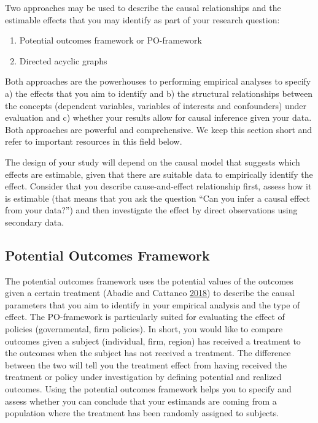 \documentclass[
]{book}
\providecommand{\tightlist}{%
  \setlength{\itemsep}{0pt}\setlength{\parskip}{0pt}}
\begin{document}
Two approaches may be used to describe the causal relationships and the
estimable effects that you may identify as part of your research
question:

\begin{enumerate}
\def\labelenumi{\arabic{enumi}.}
\tightlist
\item
  Potential outcomes framework or PO-framework
\item
  Directed acyclic graphs
\end{enumerate}

Both approaches are the powerhouses to performing empirical analyses to
specify a) the effects that you aim to identify and b) the structural
relationships between the concepts (dependent variables, variables of
interests and confounders) under evaluation and c) whether your results
allow for causal inference given your data. Both approaches are powerful
and comprehensive. We keep this section short and refer to important
resources in this field below.

The design of your study will depend on the causal model that suggests
which effects are estimable, given that there are suitable data to
empirically identify the effect. Consider that you describe
cause-and-effect relationship first, assess how it is estimable (that
means that you ask the question ``Can you infer a causal effect from
your data?'') and then investigate the effect by direct observations
using secondary data.

\hypertarget{potential-outcomes-framework}{%
\subsection{Potential Outcomes
Framework}\label{potential-outcomes-framework}}

The potential outcomes framework uses the potential values of the
outcomes given a certain treatment (Abadie and Cattaneo
\protect\hyperlink{ref-abadie_econometric_2018}{2018}) to describe the
causal parameters that you aim to identify in your empirical analysis
and the type of effect. The PO-framework is particularly suited for
evaluating the effect of policies (governmental, firm policies). In
short, you would like to compare outcomes given a subject (individual,
firm, region) has received a treatment to the outcomes when the subject
has not received a treatment. The difference between the two will tell
you the treatment effect from having received the treatment or policy
under investigation by defining potential and realized outcomes. Using
the potential outcomes framework helps you to specify and assess whether
you can conclude that your estimands are coming from a population where
the treatment has been randomly assigned to subjects.
\end{document}
